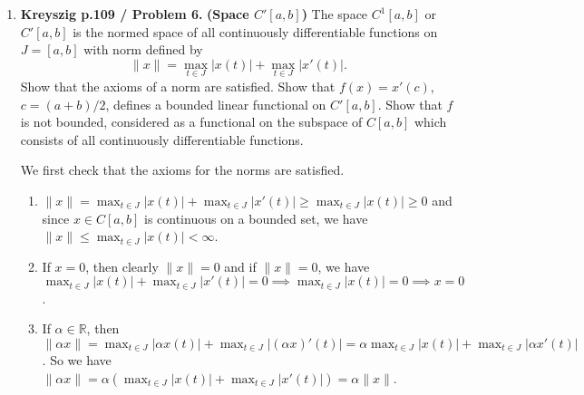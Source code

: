 \documentclass[12pt]{article}
\newcommand{\rl}{\mathbb{R}}
\begin{document}
\begin{enumerate}
\begin{mybox}
    \vspace*{2mm}
    Similarly, for $x$, $y\in C[a,b]$ and $\gamma\in \rl$,
    $f_2(\gamma x+y)=\alpha (\gamma x+y)(a)+\beta(\gamma x+y)
    (b)=\alpha\gamma x(a)+\alpha y(a)+\beta\gamma x(b)+
    \beta y(b)=\gamma(\alpha x(a)+\beta x(b))+\alpha y(a)
    +\beta y(b)=\gamma f_2(x)+f_2(y).$ And,

    $$\left\|f_2(x)\right\|=\left\| \alpha x(a)+ \beta x(b)
    \right\|\leq \|\alpha x(a)\|+ \|\beta x(b)\|
    \leq \alpha\|x\| +\beta\|x\|=(\alpha+\beta)\|x\|.$$
    Hence, $f_2$ is also linear and bounded.
\end{mybox}
 
\item \textbf{Kreyszig p.109 / Problem 6.}
    \textbf{(Space $C'[a,b]$)}
    The space $C^1[a,b]$ or $C'[a,b]$ is the normed space
    of all continuously differentiable functions on
    $J = [a, b]$ with norm defined by
    $$\|x\| = \max_{t\in J}|x(t)|+\max_{t\in J}|x'(t)|.$$
    Show that the axioms of a norm are satisfied. Show that
    $f(x) = x'(c)$, $c=(a+b)/2$, defines a bounded linear
    functional on $C'[a,b]$. Show that $f$ is not bounded,
    considered as a functional on the subspace of $C[a,b]$
    which consists of all continuously differentiable
    functions.
\begin{mybox}

    We first check that the axioms for the norms are
    satisfied.

    \vspace*{2mm}
    \begin{enumerate}
        \item $\|x\|=\max_{t\in J}|x(t)|+\max_{t\in J}|x'(t)|
            \geq \max_{t\in J}|x(t)|\geq 0$ and since
            $x\in C[a,b]$ is continuous on a bounded set,
            we have $\|x\|\leq \max_{t\in J}|x(t)|
            <\infty$.

            \vspace*{2mm}
        \item If $x=0$, then clearly $\|x\|=0$ and if
            $\|x\|=0$, we have
            $\max_{t\in J}|x(t)|+\max_{t\in J}|x'(t)|=0
            \implies \max_{t\in J}|x(t)|=0
            \implies x=0$.

            \vspace*{2mm}
        \item If $\alpha\in\rl$, then
            $\|\alpha x\|= \max_{t\in J}|\alpha x(t)|+
            \max_{t\in J}|(\alpha x)'(t)|=\alpha
            \max_{t\in J}|x(t)|+\max_{t\in J}|\alpha x'(t)|$.
            So we have $\|\alpha x\|=
            \alpha(\max_{t\in J}|x(t)|+\max_{t\in J}|x'(t)|)
            =\alpha\|x\|$.


\end{enumerate}
\end{mybox}
\end{enumerate}
\end{document}
